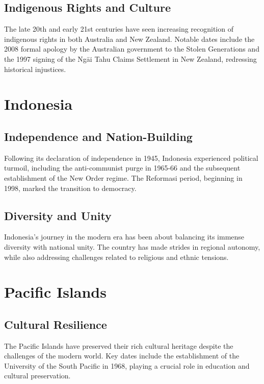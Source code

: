 \documentclass[a4paper,12pt]{book}
\begin{document}
\subsection{Indigenous Rights and Culture}
\label{subsec:indigenous-rights-culture}
The late 20th and early 21st centuries have seen increasing recognition of indigenous rights in both Australia and New Zealand. Notable dates include the 2008 formal apology by the Australian government to the Stolen Generations and the 1997 signing of the Ngāi Tahu Claims Settlement in New Zealand, redressing historical injustices.

\section{Indonesia}
\label{sec:indonesia}

\subsection{Independence and Nation-Building}
\label{subsec:independence-nation-building}
Following its declaration of independence in 1945, Indonesia experienced political turmoil, including the anti-communist purge in 1965-66 and the subsequent establishment of the New Order regime. The Reformasi period, beginning in 1998, marked the transition to democracy.

\subsection{Diversity and Unity}
\label{subsec:diversity-unity}
Indonesia’s journey in the modern era has been about balancing its immense diversity with national unity. The country has made strides in regional autonomy, while also addressing challenges related to religious and ethnic tensions.

\section{Pacific Islands}
\label{sec:pacific-islands}

\subsection{Cultural Resilience}
\label{subsec:cultural-resilience}
The Pacific Islands have preserved their rich cultural heritage despite the challenges of the modern world. Key dates include the establishment of the University of the South Pacific in 1968, playing a crucial role in education and cultural preservation.
\end{document}
